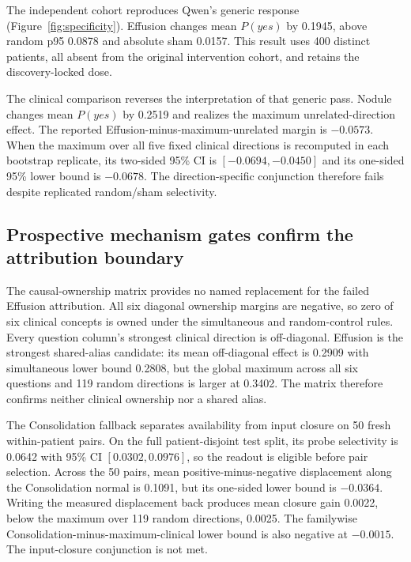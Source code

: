 The independent cohort reproduces Qwen's generic response (Figure~\ref{fig:specificity}). Effusion changes mean $P(yes)$ by 0.1945, above random p95 0.0878 and absolute sham 0.0157. This result uses 400 distinct patients, all absent from the original intervention cohort, and retains the discovery-locked dose.

The clinical comparison reverses the interpretation of that generic pass. Nodule changes mean $P(yes)$ by 0.2519 and realizes the maximum unrelated-direction effect. The reported Effusion-minus-maximum-unrelated margin is $-0.0573$. When the maximum over all five fixed clinical directions is recomputed in each bootstrap replicate, its two-sided 95\% CI is $[-0.0694,-0.0450]$ and its one-sided 95\% lower bound is $-0.0678$. The direction-specific conjunction therefore fails despite replicated random/sham selectivity.

\subsection{Prospective mechanism gates confirm the attribution boundary}
\label{sec:mechanism-results}



The causal-ownership matrix provides no named replacement for the failed Effusion attribution. All six diagonal ownership margins are negative, so zero of six clinical concepts is owned under the simultaneous and random-control rules. Every question column's strongest clinical direction is off-diagonal. Effusion is the strongest shared-alias candidate: its mean off-diagonal effect is 0.2909 with simultaneous lower bound 0.2808, but the global maximum across all six questions and 119 random directions is larger at 0.3402. The matrix therefore confirms neither clinical ownership nor a shared alias.

The Consolidation fallback separates availability from input closure on 50 fresh within-patient pairs. On the full patient-disjoint test split, its probe selectivity is 0.0642 with 95\% CI $[0.0302,0.0976]$, so the readout is eligible before pair selection. Across the 50 pairs, mean positive-minus-negative displacement along the Consolidation normal is 0.1091, but its one-sided lower bound is $-0.0364$. Writing the measured displacement back produces mean closure gain 0.0022, below the maximum over 119 random directions, 0.0025. The familywise Consolidation-minus-maximum-clinical lower bound is also negative at $-0.0015$. The input-closure conjunction is not met.


